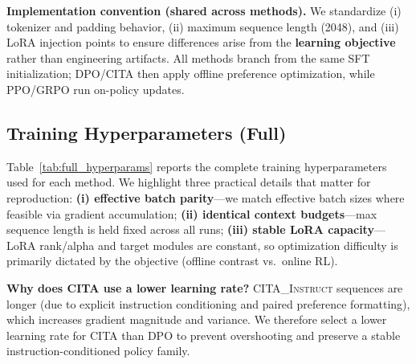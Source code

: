 \vspace{-0.35em}
\noindent\textbf{Implementation convention (shared across methods).}
We standardize (i) tokenizer and padding behavior, (ii) maximum sequence length (2048), and (iii) LoRA injection points to ensure differences arise from the \textbf{learning objective} rather than engineering artifacts.
All methods branch from the same SFT initialization; \textsc{DPO}/\textsc{CITA} then apply offline preference optimization, while \textsc{PPO}/\textsc{GRPO} run on-policy updates.

\subsection{Training Hyperparameters (Full)}

\vspace{-0.25em}
\noindent
Table~\ref{tab:full_hyperparams} reports the complete training hyperparameters used for each method.
We highlight three practical details that matter for reproduction:
\textbf{(i) effective batch parity}---we match effective batch sizes where feasible via gradient accumulation;
\textbf{(ii) identical context budgets}---max sequence length is held fixed across all runs;
\textbf{(iii) stable LoRA capacity}---LoRA rank/alpha and target modules are constant, so optimization difficulty is primarily dictated by the objective (offline contrast vs.\ online RL).

\vspace{-0.25em}
\noindent
\textbf{Why does \textsc{CITA} use a lower learning rate?}
\textsc{CITA\_Instruct} sequences are longer (due to explicit instruction conditioning and paired preference formatting), which increases gradient magnitude and variance.
We therefore select a lower learning rate for \textsc{CITA} than \textsc{DPO} to prevent overshooting and preserve a stable instruction-conditioned policy family.

